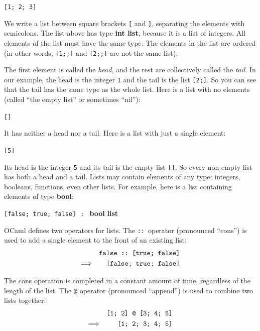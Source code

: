 \documentclass[]{book}
\newcommand{\smspace}{\vspace{4mm}}
\begin{document}
\smspace
\verb![1; 2; 3]!
\smspace

\noindent We write a list between square brackets \texttt{[} and \texttt{]}, separating the elements with semicolons. The list above has type \textrm{\textbf{int list}}, because it is a list of integers. All elements of the list must have the same type. The elements in the list are ordered (in other words, \texttt{[1;;]} and \texttt{[2;;]} are not the same list).

The first element is called the \textit{head}, and the rest are collectively called the \textit{tail}. In our example, the head is the integer \verb!1! and the tail is the list \texttt{[2;]}. So you can see that the tail has the same type as the whole list. Here is a list with no elements (called ``the empty list'' or sometimes ``nil''):

\smspace
\verb![]!
\smspace

\noindent It has neither a head nor a tail. Here is a list with just a single element:

\smspace
\verb![5]!
\smspace

\noindent Its head is the integer \texttt{5} and its tail is the empty list \texttt{[]}. So every non-empty list has both a head and a tail. Lists may contain elements of any type: integers, booleans, functions, even other lists. For example, here is a list containing elements of type \textbf{\textrm{bool}}:

\smspace
\texttt{[false; true; false]} \ : \ \textrm{\textbf{bool}} \textrm{\textbf{list}}
\smspace

\noindent OCaml defines two operators for lists. The \texttt{::}\ operator (pronounced ``cons'') is used to add a single element to the front of an existing list:
\begin{eqnarray*}
 & & \verb!false :: [true; false]! \\
 \Longrightarrow & & \verb![false; true; false]!
\end{eqnarray*}

\noindent The cons operation is completed in a constant amount of time, regardless of the length of the list. The \texttt{@} operator (pronounced ``append'') is used to combine two lists together:
\begin{eqnarray*}
 & & \verb![1; 2] @ [3; 4; 5]! \\
 \Longrightarrow & & \verb![1; 2; 3; 4; 5]!
\end{eqnarray*}
\end{document}

